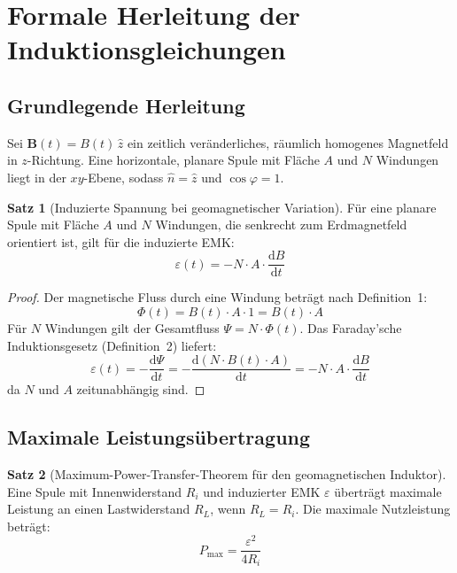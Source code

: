 ﻿\documentclass[a4paper,12pt]{article}
\theoremstyle{definition}
\newtheorem{satz}{Satz}
\begin{document}
\section{Formale Herleitung der Induktionsgleichungen}

\subsection{Grundlegende Herleitung}

Sei $\mathbf{B}(t) = B(t)\,\hat{z}$ ein zeitlich ver\"anderliches, r\"aumlich
homogenes Magnetfeld in $z$-Richtung. Eine horizontale, planare Spule mit
Fl\"ache $A$ und $N$ Windungen liegt in der $xy$-Ebene, sodass $\hat{n} = \hat{z}$
und $\cos\varphi = 1$.

\begin{satz}[Induzierte Spannung bei geomagnetischer Variation]
\label{satz:induktion}
    F\"ur eine planare Spule mit Fl\"ache $A$ und $N$ Windungen, die senkrecht
    zum Erdmagnetfeld orientiert ist, gilt f\"ur die induzierte EMK:
    \[
        \varepsilon(t) = -N \cdot A \cdot \frac{\mathrm{d}B}{\mathrm{d}t}
    \]
\end{satz}

\begin{proof}
    Der magnetische Fluss durch eine Windung betr\"agt nach Definition~1:
    \[
        \Phi(t) = B(t) \cdot A \cdot 1 = B(t) \cdot A
    \]
    F\"ur $N$ Windungen gilt der Gesamtfluss $\Psi = N \cdot \Phi(t)$.
    Das Faraday'sche Induktionsgesetz (Definition~2) liefert:
    \[
        \varepsilon(t) = -\frac{\mathrm{d}\Psi}{\mathrm{d}t}
        = -\frac{\mathrm{d}(N \cdot B(t) \cdot A)}{\mathrm{d}t}
        = -N \cdot A \cdot \frac{\mathrm{d}B}{\mathrm{d}t}
    \]
    da $N$ und $A$ zeitunabh\"angig sind.
\end{proof}

\subsection{Maximale Leistungs\"ubertragung}

\begin{satz}[Maximum-Power-Transfer-Theorem f\"ur den geomagnetischen Induktor]
\label{satz:leistung}
    Eine Spule mit Innenwiderstand $R_i$ und induzierter EMK $\varepsilon$
    \"ubertr\"agt maximale Leistung an einen Lastwiderstand $R_L$, wenn
    $R_L = R_i$. Die maximale Nutzleistung betr\"agt:
    \[
        P_{\max} = \frac{\varepsilon^2}{4 R_i}
    \]
\end{satz}
\end{document}
